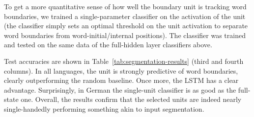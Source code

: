 
To get a more quantitative sense of how well the boundary unit is
tracking word boundaries, we trained a single-parameter classifier on
the activation of the unit (the classifier simply sets an optimal
threshold on the unit activation to separate word boundaries from
word-initial/internal positions). The classifier was trained and tested
on the same data of the full-hidden layer classifiers above.

Test accuracies are shown in Table~\ref{tab:segmentation-results}
(third and fourth columns).  In all languages, the unit is strongly
predictive of word boundaries, clearly outperforming the random
baseline. Once more, the LSTM has a clear advantage. Surprisingly, in
German the single-unit classifier is as good as the full-state
one. Overall, the results confirm that the selected units are indeed
nearly single-handedly performing something akin to input
segmentation.

